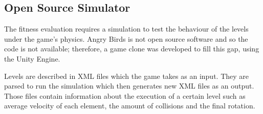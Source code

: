 \subsection{Open Source Simulator}

The fitness evaluation requires a simulation to test the behaviour of the levels under the game's physics. Angry Birds is not open source software and so the code is not available; therefore, a game clone was developed to fill this gap, using the Unity Engine.

Levels are described in XML files which the game takes as an input. They are parsed to run the simulation which then generates new XML files as an output. Those files contain information about the execution of a certain level such as average velocity of each element, the amount of collisions and the final rotation. 